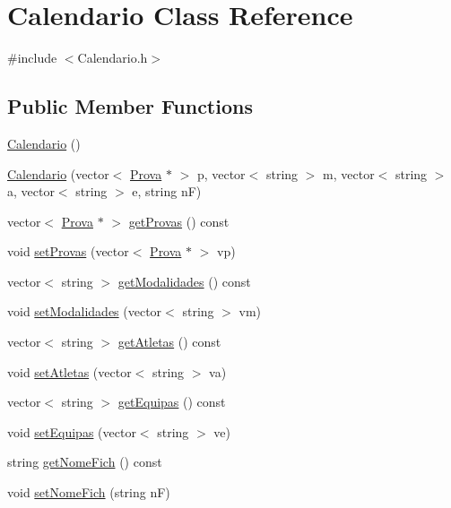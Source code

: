 \hypertarget{class_calendario}{}\section{Calendario Class Reference}
\label{class_calendario}


{\ttfamily \#include $<$Calendario.\+h$>$}

\subsection*{Public Member Functions}
\begin{DoxyCompactItemize}
\item 
\hyperlink{class_calendario_a2aa60aa6d3c27f696018cc09d2748ea5}{Calendario} ()
\item 
\hyperlink{class_calendario_aed6e937e701548fcd80f9c154232a358}{Calendario} (vector$<$ \hyperlink{class_prova}{Prova} $\ast$ $>$ p, vector$<$ string $>$ m, vector$<$ string $>$ a, vector$<$ string $>$ e, string n\+F)
\item 
vector$<$ \hyperlink{class_prova}{Prova} $\ast$ $>$ \hyperlink{class_calendario_a614b94b28d14852af27b60c49342b52c}{get\+Provas} () const 
\item 
void \hyperlink{class_calendario_a8995f4994281e459ebb013a67ca782d0}{set\+Provas} (vector$<$ \hyperlink{class_prova}{Prova} $\ast$ $>$ vp)
\item 
vector$<$ string $>$ \hyperlink{class_calendario_aa92791918d953f34250063a67d0d6232}{get\+Modalidades} () const 
\item 
void \hyperlink{class_calendario_a7cb27d11676ca4fc42704be917469605}{set\+Modalidades} (vector$<$ string $>$ vm)
\item 
vector$<$ string $>$ \hyperlink{class_calendario_abfc38a3a96e33ec237496ed83c3259a5}{get\+Atletas} () const 
\item 
void \hyperlink{class_calendario_aa9691cb641df0e63197445f891e763a7}{set\+Atletas} (vector$<$ string $>$ va)
\item 
vector$<$ string $>$ \hyperlink{class_calendario_aff13d470983e46172aca04dda560332d}{get\+Equipas} () const 
\item 
void \hyperlink{class_calendario_a231a630e1b58f9637814169f8b5364fe}{set\+Equipas} (vector$<$ string $>$ ve)
\item 
string \hyperlink{class_calendario_a8ec3b8d1862fc893922561d97e4341cb}{get\+Nome\+Fich} () const 
\item 
void \hyperlink{class_calendario_af538ad94515f132774b870a9bfc2a01d}{set\+Nome\+Fich} (string n\+F)

\end{DoxyCompactItemize}

